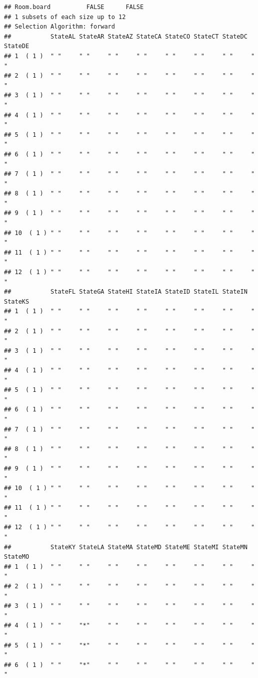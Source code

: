 \documentclass[]{article}
\begin{document}
\begin{verbatim}
## Room.board          FALSE      FALSE
## 1 subsets of each size up to 12
## Selection Algorithm: forward
##           StateAL StateAR StateAZ StateCA StateCO StateCT StateDC StateDE
## 1  ( 1 )  " "     " "     " "     " "     " "     " "     " "     " "    
## 2  ( 1 )  " "     " "     " "     " "     " "     " "     " "     " "    
## 3  ( 1 )  " "     " "     " "     " "     " "     " "     " "     " "    
## 4  ( 1 )  " "     " "     " "     " "     " "     " "     " "     " "    
## 5  ( 1 )  " "     " "     " "     " "     " "     " "     " "     " "    
## 6  ( 1 )  " "     " "     " "     " "     " "     " "     " "     " "    
## 7  ( 1 )  " "     " "     " "     " "     " "     " "     " "     " "    
## 8  ( 1 )  " "     " "     " "     " "     " "     " "     " "     " "    
## 9  ( 1 )  " "     " "     " "     " "     " "     " "     " "     " "    
## 10  ( 1 ) " "     " "     " "     " "     " "     " "     " "     " "    
## 11  ( 1 ) " "     " "     " "     " "     " "     " "     " "     " "    
## 12  ( 1 ) " "     " "     " "     " "     " "     " "     " "     " "    
##           StateFL StateGA StateHI StateIA StateID StateIL StateIN StateKS
## 1  ( 1 )  " "     " "     " "     " "     " "     " "     " "     " "    
## 2  ( 1 )  " "     " "     " "     " "     " "     " "     " "     " "    
## 3  ( 1 )  " "     " "     " "     " "     " "     " "     " "     " "    
## 4  ( 1 )  " "     " "     " "     " "     " "     " "     " "     " "    
## 5  ( 1 )  " "     " "     " "     " "     " "     " "     " "     " "    
## 6  ( 1 )  " "     " "     " "     " "     " "     " "     " "     " "    
## 7  ( 1 )  " "     " "     " "     " "     " "     " "     " "     " "    
## 8  ( 1 )  " "     " "     " "     " "     " "     " "     " "     " "    
## 9  ( 1 )  " "     " "     " "     " "     " "     " "     " "     " "    
## 10  ( 1 ) " "     " "     " "     " "     " "     " "     " "     " "    
## 11  ( 1 ) " "     " "     " "     " "     " "     " "     " "     " "    
## 12  ( 1 ) " "     " "     " "     " "     " "     " "     " "     " "    
##           StateKY StateLA StateMA StateMD StateME StateMI StateMN StateMO
## 1  ( 1 )  " "     " "     " "     " "     " "     " "     " "     " "    
## 2  ( 1 )  " "     " "     " "     " "     " "     " "     " "     " "    
## 3  ( 1 )  " "     " "     " "     " "     " "     " "     " "     " "    
## 4  ( 1 )  " "     "*"     " "     " "     " "     " "     " "     " "    
## 5  ( 1 )  " "     "*"     " "     " "     " "     " "     " "     " "    
## 6  ( 1 )  " "     "*"     " "     " "     " "     " "     " "     " "    

\end{verbatim}
\end{document}
